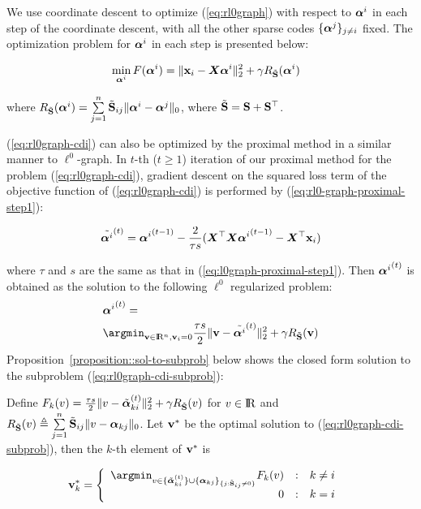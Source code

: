 \documentclass[10pt,twocolumn,letterpaper]{article}
\begin{document}
We use coordinate descent to optimize (\ref{eq:rl0graph}) with respect to $\bm{\alpha}^i$ in each step of the coordinate descent, with all the other sparse codes $\{\bm{\alpha}^j\}_{j \neq i}$ fixed. The optimization problem for $\bm{\alpha}^i$ in each step is presented below:
\begin{small}
\begin{align}\label{eq:rl0graph-cdi}
&\mathop {\min }\limits_{\bm{\alpha}^i} F(\bm{\alpha}^i) =  \|{\mathbf{x}_i} - {\bm X}\bm{\alpha}^{i}\|_2^2 + \gamma  R_{\tilde {\mathbf{S}}}(\bm{\alpha}^i)
\end{align}
\end{small}
where $R_{\tilde {\mathbf{S}}}(\bm{\alpha}^i) = \sum\limits_{j=1}^n {\tilde {\mathbf{S}}_{ij} \|\bm{\alpha}^i - \bm{\alpha}^j\|_0  }$, where $\tilde {\mathbf{S}} = \mathbf{S} + \mathbf{S}^\top$.

(\ref{eq:rl0graph-cdi}) can also be optimized by the proximal method in a similar manner to $\ell^{0}$-graph. In $t$-th ($t \ge 1$) iteration of our proximal method for the problem (\ref{eq:rl0graph-cdi}), gradient descent on the squared loss term of the objective function of (\ref{eq:rl0graph-cdi}) is performed by (\ref{eq:rl0-graph-proximal-step1}):
\begin{small}\begin{align}\label{eq:rl0-graph-proximal-step1}
\tilde {\bm{\alpha}^i}^{(t)} = {\bm{\alpha}^i}^{(t-1)} - \frac{2}{{\tau}s} ({\bm X^\top}{\bm X}{{\bm{\alpha}^i}^{(t-1)}}-{\bm X^\top}{\mathbf{x}_i})
\end{align}\end{small}
where $\tau$ and $s$ are the same as that in (\ref{eq:l0graph-proximal-step1}). Then ${\bm{\alpha}^i}^{(t)}$ is obtained as the solution to the following $\ell^{0}$ regularized problem:
\begin{align}\label{eq:rl0graph-cdi-subprob}
&{\balpha^i}^{(t)} = \nonumber \\
&{\argmin}_{{\bv \in \R^{n}, \bv_{i} = 0}} {\frac{{\tau} s}{2}\|\bv - \tilde {\balpha^i}^{(t)}\|_2^2 + \gamma R_{\tilde \bS}(\bv)  }
\end{align}
Proposition~\ref{proposition::sol-to-subprob} below shows the closed form solution to the subproblem (\ref{eq:rl0graph-cdi-subprob}):
\begin{MyProposition}\label{proposition::sol-to-subprob}
Define $F_k(v) = \frac{{\tau} s}{2}\|v - \tilde {\bm{\alpha}}_{ki}^{(t)}\|_2^2 + \gamma R_{\tilde {\mathbf{S}}}(v)$ for $v \in {\rm I}\kern-0.18em{\rm R}$ and $R_{\tilde {\mathbf{S}}}(v) \triangleq \sum\limits_{j=1}^n {\tilde {\mathbf{S}}_{ij} \|v - \bm{\alpha}_{kj}\|_0  }$. Let $\mathbf{v}^{*}$ be the optimal solution to (\ref{eq:rl0graph-cdi-subprob}), then the $k$-th element of $\mathbf{v}^{*}$ is
\begin{small}\begin{align}\label{eq:rl0graph-proximal-step2}
&\bv_k^{*} =
\left\{
\begin{array}
    {r@{\quad:\quad}l}
    \argmin_{v \in \{\tilde {\balpha}_{ki}^{(t)}\} \cup \{\balpha_{kj}\}_{\{j: \tilde \bS_{ij} \neq 0\}} } F_k(v) & { k \neq i} \\
    0 & k = i
\end{array}
\right.
\end{align}\end{small}
\end{MyProposition}
\end{document}

